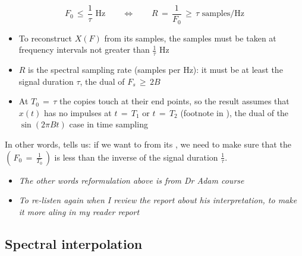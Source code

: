 \begin{equation}
\boxed{
F_0 \, \leq \, \frac{1}{\tau} \text{ Hz} \qquad \Longleftrightarrow \qquad R \, = \, \frac{1}{F_0} \, \geq \, \tau \text{ samples/Hz}
}
\label{Eq:Sampling:spectral_sampling_condition}
\end{equation}

\begin{itemize}

\item To reconstruct $X(F)$ from its samples, the samples must be taken at frequency intervals not greater than $\frac{1}{\tau}$ Hz

\item $R$ is the spectral sampling rate (samples per Hz): it must be at least the signal duration $\tau$, the dual of $F_s \, \geq \, 2B$

\item At $T_0 \, = \, \tau$ the copies touch at their end points, so the result assumes that $x(t)$ has no impulses at $t \, = \, T_1$ or $t \, = \, T_2$ (footnote in \cite{signal_processing_Lathi}), the dual of the $\sin(2 \pi B t)$ case in time sampling

\end{itemize}

In other words,  tells us: if we want to  from its , we need to make sure that the  $ \left(\, F_0 \, = \, \displaystyle\frac{1}{T_0} \, \right)$ is less than the inverse of the signal duration $\displaystyle\frac{1}{\tau}$.\\

\begin{itemize}

\item \textit{The other words reformulation above is from Dr Adam course}

\item \textit{To re-listen again when I review the report about his interpretation, to make it more aling in my reader report}

\end{itemize}





\newpage
\subsection{Spectral interpolation}

